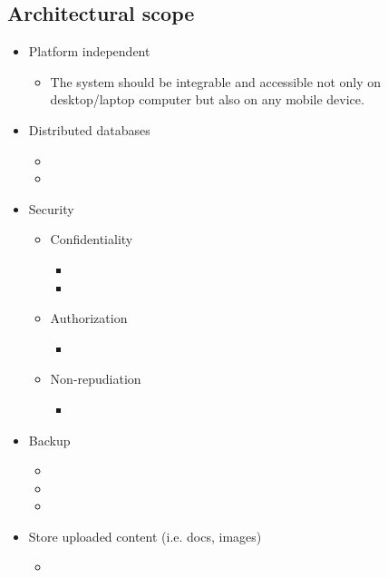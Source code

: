 \subsection{Architectural scope}

\begin{itemize}
  \item Platform independent
      \begin{itemize}
        \item The system should be integrable and accessible not only on desktop/laptop computer but also on any mobile device.
      \end{itemize}
      
  \item Distributed databases
      \begin{itemize}
        \item     
        \item     
      \end{itemize}
  
  \item Security
      \begin{itemize}
        \item Confidentiality    
      
              \begin{itemize}
                \item  
                \item  
              \end{itemize}
      
        \item Authorization  
        
              \begin{itemize}
                \item  
              \end{itemize}
              
        \item Non-repudiation
        
              \begin{itemize}
                \item  
              \end{itemize}

        
      \end{itemize}
      
        \item Backup
        
              \begin{itemize}
                \item  
                \item  
                \item  
              \end{itemize}
              
        \item Store uploaded content (i.e. docs, images)
              \begin{itemize}
                \item  
              \end{itemize}  
              
\end{itemize}
